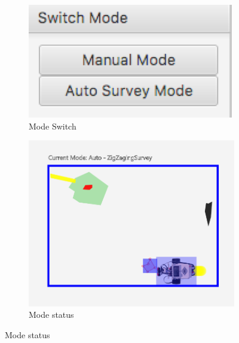 \documentclass[10pt,a4paper,titlepage]{article}
\begin{document}
\begin{figure}[H]
	\centering
	\begin{subfigure}[t]{0.4\textwidth}
		\includegraphics[width=0.95\linewidth]{mode.png}  
  \caption{Mode Switch} 
\label{fig:Mode Switch}                
	\end{subfigure}
	\begin{subfigure}[t]{0.4\textwidth}
		\includegraphics[width=0.95\linewidth]{status.png}  
  \caption{Mode status} 
\label{fig:Mode status}               
	\end{subfigure}
\end{figure}
\end{document}
